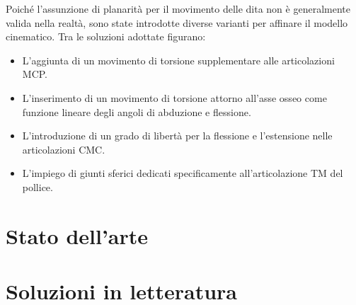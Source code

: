 Poiché l'assunzione di planarità per il movimento delle dita non è generalmente valida nella realtà, sono state introdotte diverse varianti per affinare il modello cinematico.
Tra le soluzioni adottate figurano:

\begin{itemize}
    \item L'aggiunta di un movimento di torsione supplementare alle articolazioni MCP.
    \item L'inserimento di un movimento di torsione attorno all'asse osseo come funzione lineare degli angoli di abduzione e flessione.
    \item L'introduzione di un grado di libertà per la flessione e l'estensione nelle articolazioni CMC.
    \item L'impiego di giunti sferici dedicati specificamente all'articolazione TM del pollice.
\end{itemize}




\section{Stato dell'arte}





\section{Soluzioni in letteratura}
